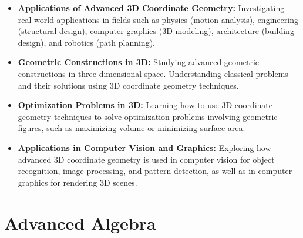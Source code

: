 \documentclass[openany]{book}
\begin{document}
\begin{itemize}
    \item \textbf{Applications of Advanced 3D Coordinate Geometry:} Investigating real-world applications in fields such as physics (motion analysis), engineering (structural design), computer graphics (3D modeling), architecture (building design), and robotics (path planning).
    \item \textbf{Geometric Constructions in 3D:} Studying advanced geometric constructions in three-dimensional space. Understanding classical problems and their solutions using 3D coordinate geometry techniques.
    \item \textbf{Optimization Problems in 3D:} Learning how to use 3D coordinate geometry techniques to solve optimization problems involving geometric figures, such as maximizing volume or minimizing surface area.
    \item \textbf{Applications in Computer Vision and Graphics:} Exploring how advanced 3D coordinate geometry is used in computer vision for object recognition, image processing, and pattern detection, as well as in computer graphics for rendering 3D scenes.
\end{itemize}
\section{Advanced Algebra}
\end{document}
